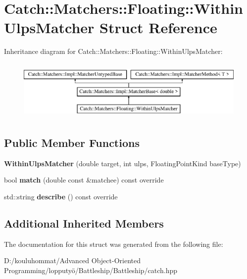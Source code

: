 \hypertarget{struct_catch_1_1_matchers_1_1_floating_1_1_within_ulps_matcher}{}\section{Catch\+:\+:Matchers\+:\+:Floating\+:\+:Within\+Ulps\+Matcher Struct Reference}
\label{struct_catch_1_1_matchers_1_1_floating_1_1_within_ulps_matcher}
Inheritance diagram for Catch\+:\+:Matchers\+:\+:Floating\+:\+:Within\+Ulps\+Matcher\+:\begin{figure}[H]
\begin{center}
\leavevmode
\includegraphics[height=2.968198cm]{struct_catch_1_1_matchers_1_1_floating_1_1_within_ulps_matcher}
\end{center}
\end{figure}
\subsection*{Public Member Functions}
\begin{DoxyCompactItemize}
\item 
\mbox{\label{struct_catch_1_1_matchers_1_1_floating_1_1_within_ulps_matcher_a836074ae4010275284ab66b2485c6575}} 
{\bfseries Within\+Ulps\+Matcher} (double target, int ulps, Floating\+Point\+Kind base\+Type)
\item 
\mbox{\label{struct_catch_1_1_matchers_1_1_floating_1_1_within_ulps_matcher_aabda42a0dc5d00f3c5916feb75006b32}} 
bool {\bfseries match} (double const \&matchee) const override
\item 
\mbox{\label{struct_catch_1_1_matchers_1_1_floating_1_1_within_ulps_matcher_ad9bc8bb7f3abd326580a4bf6cf369b1b}} 
std\+::string {\bfseries describe} () const override
\end{DoxyCompactItemize}
\subsection*{Additional Inherited Members}


The documentation for this struct was generated from the following file\+:\begin{DoxyCompactItemize}
\item 
D\+:/kouluhommat/\+Advanced Object-\/\+Oriented Programming/lopputyö/\+Battleship/\+Battleship/catch.\+hpp\end{DoxyCompactItemize}
